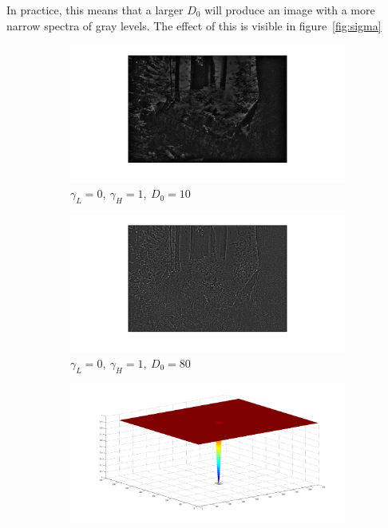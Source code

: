 		In practice, this means that a larger $D_0$ will produce an image with a more 
		narrow spectra of gray levels. The effect of this is visible in figure~\ref{fig:sigma}
		\begin{figure}[h!]
			\centering
			\begin{subfigure}[b]{0.7\textwidth}
				\includegraphics[width=\textwidth]{pics/low_sigma.png}
				\caption{$\gamma_L = 0,~\gamma_H = 1,~D_0 = 10$}
				\label{fig:low_sigma}
			\end{subfigure}%
			\begin{subfigure}[b]{0.7\textwidth}
				\includegraphics[width=\textwidth]{pics/high_sigma.png}
				\caption{$\gamma_L = 0,~\gamma_H = 1,~D_0 =80$}
				\label{fig:high_sigma}
			\end{subfigure}
			\label{fig:sigma}
			\begin{subfigure}[b]{0.6\textwidth}
				\includegraphics[width=\textwidth]{pics/low_sigma_filter.png}

\end{subfigure}
\end{figure}

